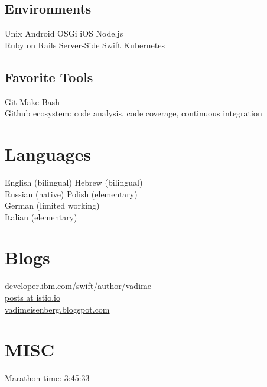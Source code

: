 \documentclass[]{deedy-resume}
\begin{document}
\begin{minipage}[t]{0.33\textwidth}
\subsection{Environments}
Unix \textbullet{}  Android \textbullet{}  OSGi \textbullet{} iOS \textbullet{} Node.js \\
Ruby on Rails \textbullet{} Server-Side Swift \textbullet{} Kubernetes
\sectionsep

\subsection{Favorite Tools}
Git \textbullet{}  Make \textbullet{}  Bash \textbullet{} \\
Github ecosystem: code analysis, code coverage, continuous integration
\sectionsep

\section{Languages}
\vspace{\topsep} %
English (bilingual) \textbullet{} Hebrew (bilingual) \\
Russian (native)  \textbullet{} Polish (elementary) \\
German (limited working) \\
Italian (elementary)
\sectionsep

\sectionsep

\section{Blogs}
\href{https://developer.ibm.com/swift/author/vadime/}{developer.ibm.com/swift/author/vadime} \\
\href{https://istio.io/search.html?q=vadim\%20eisenberg}{posts at istio.io} \\
\href{http://vadimeisenberg.blogspot.com}{vadimeisenberg.blogspot.com}
\sectionsep

\sectionsep

\section{MISC}
Marathon time: \href{http://pzumaratonwarszawski.com/wp-content/uploads/2018/10/40PZUMaratonWarszawski_FIN2.pdf}{3:45:33}

%
%

\end{minipage}
\end{document}
